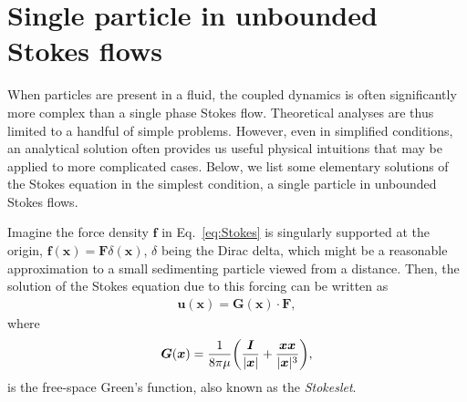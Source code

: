 \section{Single particle in unbounded Stokes flows}

When particles are present in a fluid, the coupled dynamics is often significantly more complex than a single phase Stokes flow. Theoretical analyses are thus limited to a handful of simple problems. However, even in simplified conditions, an analytical solution often provides us useful physical intuitions that may be applied to more complicated cases. Below, we list some elementary solutions of the Stokes equation in the simplest condition, \ie a single particle in unbounded Stokes flows.

\bigskip
Imagine the force density ${\bm f}$ in Eq.\ \eqref{eq:Stokes} is singularly supported at the origin, \ie ${\bm f}({\bm x})={\bm F}\delta({\bm x})$, $\delta$ being the Dirac delta, which might be a reasonable approximation to a small sedimenting particle viewed from a distance. Then, the solution of the Stokes equation due to this forcing can be written as
\begin{equation} \label{eq:stokes-green}
 \begin{aligned}
   {\bm u}({\bm x}) = {\bm G}({\bm x}) \cdot {\bm F},
 \end{aligned}
\end{equation}
where  
\begin{equation}
 \begin{aligned}
   {\bm G}({\bm x}) = \frac{1}{8\pi\mu } \bigg( \frac{{\bm I}}{\lvert\bm x\rvert}+\frac{ {\bm x}{\bm x} }{ \lvert{\bm x}\rvert^3 } \bigg),
 \end{aligned}
\end{equation}
is the free-space Green's function, also known as the \emph{Stokeslet}.

